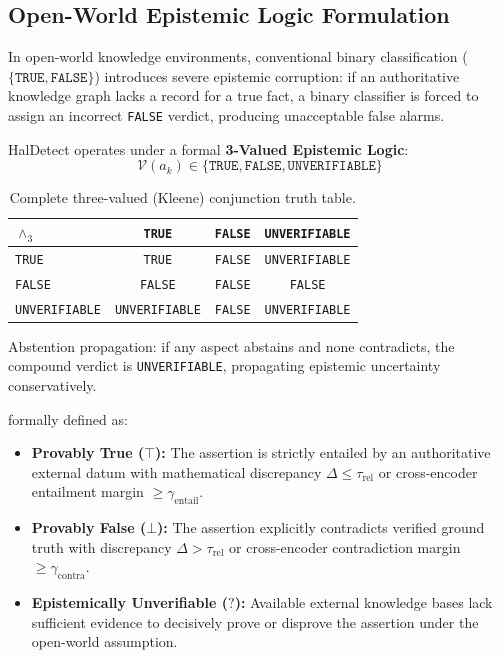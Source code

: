 \subsection{Open-World Epistemic Logic Formulation}
In open-world knowledge environments, conventional binary classification ($\{\texttt{TRUE}, \texttt{FALSE}\}$) introduces severe epistemic corruption: if an authoritative knowledge graph lacks a record for a true fact, a binary classifier is forced to assign an incorrect \texttt{FALSE} verdict, producing unacceptable false alarms.

HalDetect operates under a formal \textbf{3-Valued Epistemic Logic}:
\begin{equation}
    \mathcal{V}(a_k) \in \{\texttt{TRUE}, \texttt{FALSE}, \texttt{UNVERIFIABLE}\}
\end{equation}


\begin{table}[h]
\centering
\caption{Complete three-valued (Kleene) conjunction truth table.}
\label{tab:kleene}
\begin{tabular}{l|ccc}
$\wedge_3$ & \texttt{TRUE} & \texttt{FALSE} & \texttt{UNVERIFIABLE} \\
\hline
\texttt{TRUE}         & \texttt{TRUE}  & \texttt{FALSE} & \texttt{UNVERIFIABLE} \\
\texttt{FALSE}        & \texttt{FALSE} & \texttt{FALSE} & \texttt{FALSE} \\
\texttt{UNVERIFIABLE} & \texttt{UNVERIFIABLE} & \texttt{FALSE} & \texttt{UNVERIFIABLE} \\
\end{tabular}
\end{table}

Abstention propagation: if any aspect abstains and none contradicts, the compound verdict is \texttt{UNVERIFIABLE}, propagating epistemic uncertainty conservatively.

formally defined as:
\begin{itemize}
    \item \textbf{Provably True ($\top$):} The assertion is strictly entailed by an authoritative external datum with mathematical discrepancy $\Delta \le \tau_{\text{rel}}$ or cross-encoder entailment margin $\ge \gamma_{\text{entail}}$.
    \item \textbf{Provably False ($\bot$):} The assertion explicitly contradicts verified ground truth with discrepancy $\Delta > \tau_{\text{rel}}$ or cross-encoder contradiction margin $\ge \gamma_{\text{contra}}$.
    \item \textbf{Epistemically Unverifiable ($?$):} Available external knowledge bases lack sufficient evidence to decisively prove or disprove the assertion under the open-world assumption.
\end{itemize}

